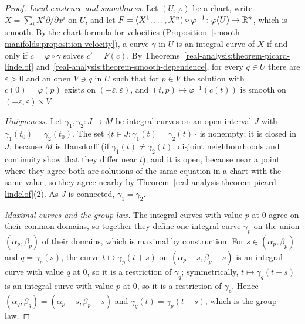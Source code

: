 \begin{proof}
\emph{Local existence and smoothness.} Let $(U, \varphi)$ be a chart, write $X = \sum_iX^i\partial/\partial x^i$ on $U$, and let
$F = (X^1, \ldots, X^n) \circ \varphi^{-1} \colon \varphi(U) \to \mathbb{R}^n$, which is smooth. By the chart formula for velocities
(Proposition~\ref{smooth-manifolds:proposition-velocity}), a curve $\gamma$ in $U$ is an integral curve of $X$ if and only if $c = \varphi \circ \gamma$ solves
$c' = F(c)$. By Theorems~\ref{real-analysis:theorem-picard-lindelof} and~\ref{real-analysis:theorem-smooth-dependence}, for every $q \in U$ there are
$\varepsilon > 0$ and an open $V \ni q$ in $U$ such that for $p \in V$ the solution with $c(0) = \varphi(p)$ exists on $(-\varepsilon, \varepsilon)$, and
$(t, p) \mapsto \varphi^{-1}(c(t))$ is smooth on $(-\varepsilon, \varepsilon) \times V$.

\emph{Uniqueness.} Let $\gamma_1, \gamma_2 \colon J \to M$ be integral curves on an open interval $J$ with $\gamma_1(t_0) = \gamma_2(t_0)$. The set
$\{t \in J : \gamma_1(t) = \gamma_2(t)\}$ is nonempty; it is closed in $J$, because $M$ is Hausdorff (if $\gamma_1(t) \neq \gamma_2(t)$, disjoint neighbourhoods
and continuity show that they differ near $t$); and it is open, because near a point where they agree both are solutions of the same equation in a chart with
the same value, so they agree nearby by Theorem~\ref{real-analysis:theorem-picard-lindelof}(2). As $J$ is connected, $\gamma_1 = \gamma_2$.

\emph{Maximal curves and the group law.} The integral curves with value $p$ at $0$ agree on their common domains, so together they define one integral curve
$\gamma_p$ on the union $(\alpha_p, \beta_p)$ of their domains, which is maximal by construction. For $s \in (\alpha_p, \beta_p)$ and $q = \gamma_p(s)$, the curve
$t \mapsto \gamma_p(t + s)$ on $(\alpha_p - s, \beta_p - s)$ is an integral curve with value $q$ at $0$, so it is a restriction of $\gamma_q$; symmetrically,
$t \mapsto \gamma_q(t - s)$ is an integral curve with value $p$ at $0$, so it is a restriction of $\gamma_p$. Hence $(\alpha_q, \beta_q) =
(\alpha_p - s, \beta_p - s)$ and $\gamma_q(t) = \gamma_p(t + s)$, which is the group law.


\end{proof}
